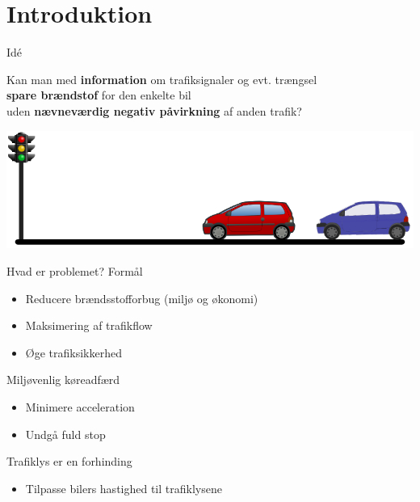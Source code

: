 \section{Introduktion}

\begin{frame}{Idé}%
\begin{center}
Kan man med \textbf{information} om trafiksignaler og evt. trængsel\\\textbf{spare brændstof} for den enkelte bil\\uden \textbf{nævneværdig negativ påvirkning} af anden trafik?
\end{center}
\includegraphics[width=1\textwidth]{../images/idea.png}
\end{frame}

\begin{frame}{Hvad er problemet?}
Formål
\begin{itemize}
\item Reducere brændsstofforbug (miljø og økonomi)
\item Maksimering af trafikflow
\item Øge trafiksikkerhed
\end{itemize}

\vspace{5mm}
Miljøvenlig køreadfærd
\begin{itemize}
\item Minimere acceleration
\item Undgå fuld stop
\end{itemize}

\vspace{5mm}
Trafiklys er en forhinding
\begin{itemize}
\item Tilpasse bilers hastighed til trafiklysene
\end{itemize}
\end{frame}

